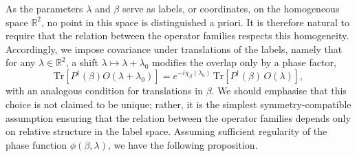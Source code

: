 \documentclass[aps,pra,onecolumn,nofootinbib,superscriptaddress,showpacs]{revtex4}
\begin{document}
As the parameters $\lambda$ and $\beta$ serve as labels, or coordinates,
on the homogeneous space $\mathbb{R}^2$, no point in this space is
distinguished a priori. It is therefore natural to require that the
relation between the operator families respects this homogeneity.
Accordingly, we impose covariance under translations of the labels,
namely that for any $\lambda\in\mathbb{R}^2$, a shift $\lambda \mapsto \lambda+\lambda_0$ modifies the
overlap only by a phase factor,
\begin{equation}
\mathrm{Tr}[P^\dagger(\beta) O(\lambda+\lambda_0)]
=e^{-i\chi_\beta(\lambda_0)}\,
\mathrm{Tr}\!\left[P^\dagger(\beta)\,O(\lambda)\right],
\end{equation}
with an analogous condition for translations in $\beta$.
We should emphasise that this choice is not claimed to be unique; rather, it is
the simplest symmetry-compatible assumption ensuring that the relation
between the operator families depends only on relative structure in the
label space. Assuming sufficient regularity of the phase function
\(\phi(\beta,\lambda)\), we have the following proposition.
\end{document}
